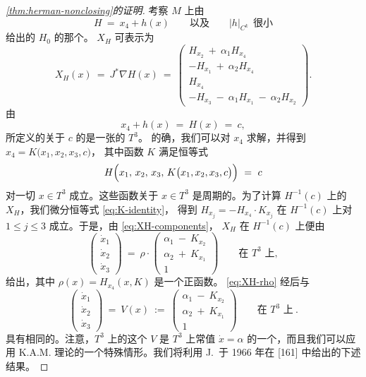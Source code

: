 \begin{proof}[\cref*{thm:herman-nonclosing}的证明]
考察 $M$ 上由
\[
H\ =\ x_{4}+h(x)\qquad\text{以及}\qquad \lvert h\rvert_{C^{k}}\ \ \text{很小}
\]
给出的 $H_{0}$ 的那个\trNeighborhood。\trHamiltonianVectorField{} $X_{H}$ 可表示为
\begin{equation}\label{eq:XH-components}
X_{H}(x)\ =\ J^{*}\nabla H(x)\ =\
\begin{pmatrix}
H_{x_{2}}\ +\ \alpha_{1}H_{x_{4}}\\
-H_{x_{1}}\ +\ \alpha_{2}H_{x_{4}}\\
H_{x_{4}}\\
-H_{x_{3}}\ -\ \alpha_{1}H_{x_{1}}\ -\ \alpha_{2}H_{x_{2}}
\end{pmatrix}.
\end{equation}
由
\[
x_{4}+h(x)\ =\ H(x)\ =\ c,
\]
所定义的关于 $c$ 的\trEnergySurface{}是一张\trEmbedding{}的\trTorus{} $T^{3}$。%
的确，我们可以对 $x_{4}$ 求解，并得到 $x_{4}=K\bigl(x_{1},x_{2},x_{3},c\bigr)$，%
其中函数 $K$ 满足恒等式
\begin{equation}\label{eq:K-identity}
H\Bigl(x_{1},\,x_{2},\,x_{3},\,K\bigl(x_{1},x_{2},x_{3},c\bigr)\Bigr)\ =\ c
\end{equation}
对一切 $x\in T^{3}$ 成立。这些函数关于 $x\in T^{3}$ 是周期的。为了计算%
$H^{-1}(c)$ 上的\trVectorField{} $X_{H}$，我们微分恒等式 \eqref{eq:K-identity}，%
得到 $H_{x_{j}}=-H_{x_{4}}\cdot K_{x_{j}}$ 在 $H^{-1}(c)$ 上对 $1\leq j\leq 3$%
成立。于是，由 \eqref{eq:XH-components}，\trVectorField{} $X_{H}$ 在 $H^{-1}(c)$%
上便由
\begin{equation}\label{eq:XH-rho}
\begin{pmatrix}\dot{x}_{1}\\[2pt] \dot{x}_{2}\\[2pt] \dot{x}_{3}\end{pmatrix}
\ =\ \rho\cdot
\begin{pmatrix}\alpha_{1}\ -\ K_{x_{2}}\\[2pt] \alpha_{2}\ +\ K_{x_{1}}\\[2pt] 1\end{pmatrix}
\qquad\text{在 $T^{3}$ 上},
\end{equation}
给出，其中 $\rho(x)=H_{x_{4}}(x,K)$ 是一个正函数。\trVectorField{} \eqref{eq:XH-rho}%
经\trReparametrization{}后与
\begin{equation}\label{eq:V-field}
\begin{pmatrix}\dot{x}_{1}\\[2pt] \dot{x}_{2}\\[2pt] \dot{x}_{3}\end{pmatrix}
\ =\ V(x)\ :=\
\begin{pmatrix}\alpha_{1}\ -\ K_{x_{2}}\\[2pt] \alpha_{2}\ +\ K_{x_{1}}\\[2pt] 1\end{pmatrix}
\qquad\text{在 $T^{3}$ 上}\ .
\end{equation}
具有相同的\trOrbit。注意，$T^{3}$ 上的这个\trVectorField{} $V$ 是 $T^{3}$ 上常值%
\trVectorField{} $\dot{x}=\alpha$ 的一个\trPerturbation，而且我们可以应用 K.A.M.%
理论的一个特殊情形。我们将利用 J.~\trMoser{}于 1966 年在 [161] 中给出的下述结果。


\end{proof}
